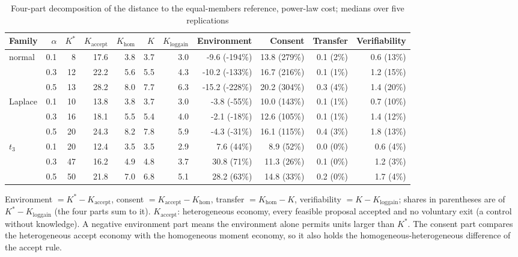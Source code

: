 \begin{table}
\centering
\caption{Four-part decomposition of the distance to the equal-members reference, power-law cost; medians over five replications}
\label{tab:decomposition-accept}
\small
\begin{tabular}{lrrrrrrrrrr}
\toprule
Family & $\alpha$ & $K^*$ & $K_{\text{accept}}$ & $K_{\text{hom}}$ & $K$ & $K_{\text{loggain}}$ & Environment & Consent & Transfer & Verifiability \\
\midrule
normal & 0.1 & 8 & 17.6 & 3.8 & 3.7 & 3.0 & -9.6 (-194\%) & 13.8 (279\%) & 0.1 (2\%) & 0.6 (13\%) \\
 & 0.3 & 12 & 22.2 & 5.6 & 5.5 & 4.3 & -10.2 (-133\%) & 16.7 (216\%) & 0.1 (1\%) & 1.2 (15\%) \\
 & 0.5 & 13 & 28.2 & 8.0 & 7.7 & 6.3 & -15.2 (-228\%) & 20.2 (304\%) & 0.3 (4\%) & 1.4 (20\%) \\
\midrule
Laplace & 0.1 & 10 & 13.8 & 3.8 & 3.7 & 3.0 & -3.8 (-55\%) & 10.0 (143\%) & 0.1 (1\%) & 0.7 (10\%) \\
 & 0.3 & 16 & 18.1 & 5.5 & 5.4 & 4.0 & -2.1 (-18\%) & 12.6 (105\%) & 0.1 (1\%) & 1.4 (12\%) \\
 & 0.5 & 20 & 24.3 & 8.2 & 7.8 & 5.9 & -4.3 (-31\%) & 16.1 (115\%) & 0.4 (3\%) & 1.8 (13\%) \\
\midrule
$t_3$ & 0.1 & 20 & 12.4 & 3.5 & 3.5 & 2.9 & 7.6 (44\%) & 8.9 (52\%) & 0.0 (0\%) & 0.6 (4\%) \\
 & 0.3 & 47 & 16.2 & 4.9 & 4.8 & 3.7 & 30.8 (71\%) & 11.3 (26\%) & 0.1 (0\%) & 1.2 (3\%) \\
 & 0.5 & 50 & 21.8 & 7.0 & 6.8 & 5.1 & 28.2 (63\%) & 14.8 (33\%) & 0.2 (0\%) & 1.7 (4\%) \\
\bottomrule
\end{tabular}
\par\smallskip\begin{minipage}{0.95\linewidth}\footnotesize Environment $= K^* - K_{\text{accept}}$, consent $= K_{\text{accept}} - K_{\text{hom}}$, transfer $= K_{\text{hom}} - K$, verifiability $= K - K_{\text{loggain}}$; shares in parentheses are of $K^* - K_{\text{loggain}}$ (the four parts sum to it). $K_{\text{accept}}$: heterogeneous economy, every feasible proposal accepted and no voluntary exit (a control without knowledge). A negative environment part means the environment alone permits units larger than $K^*$. The consent part compares the heterogeneous accept economy with the homogeneous moment economy, so it also holds the homogeneous-heterogeneous difference of the accept rule.\end{minipage}
\end{table}
